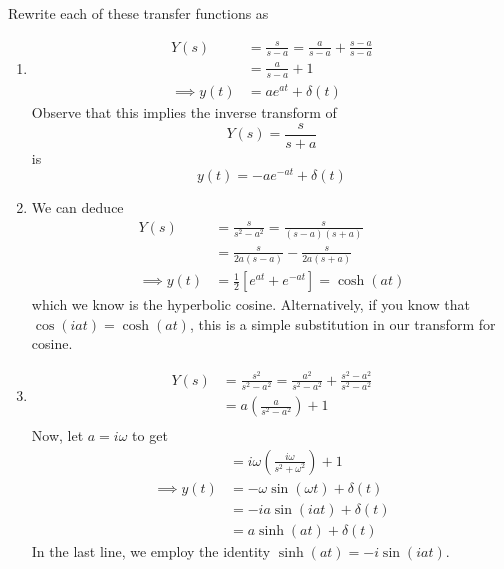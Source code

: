 \documentclass[a4paper]{article}
\begin{document}
Rewrite each of these transfer functions as
\begin{enumerate}[label=(\alph*)]
	\item 
	\begin{align*}
		Y \!\left( s  \right) & = \frac{s }{s - a } = \frac{a }{s - a } + \frac{s - a }{s - a } \\
				      & = \frac{a }{s - a } + 1 \\
				    \implies y \!\left( t \right) & = ae^{at} + \delta \!\left( t \right)
	\end{align*}
	Observe that this implies the inverse transform of 
	\[
		Y \!\left( s  \right) = \frac{s }{s + a } 
	\]
	is 
	\[
		y \!\left( t  \right) = -ae^{-at } + \delta \!\left( t \right) 
	\]
	\item 
	We can deduce
	\begin{align*}
		Y \!\left( s  \right) & = \frac{s }{s^{2} - a^{2}} = \frac{s }{\!\left( s - a  \right)\!\left( s + a \right)} \\
				      & = \frac{s }{2a \!\left( s - a \right)} - \frac{s }{2a \!\left( s + a \right)} \\
				     \implies y \!\left( t \right) & = \frac{1}{2} \!\left[ e^{at } + e^{-at} \right] = \cosh\!\left( at \right)
	\end{align*}
	which we know is the hyperbolic cosine. Alternatively, if you know that \( \cos\!\left( iat \right) = \cosh\!\left( at \right) \), this is a simple substitution in our transform for cosine.
	\item 
	\begin{align*}
		Y \!\left( s  \right) & = \frac{s^{2}}{s^{2} - a^{2}} = \frac{a^{2}}{s^{2} - a^{2}} + \frac{s^{2} - a^{2}}{s^{2} - a^{2}} \\ 
				      & = a \!\left( \frac{a}{s^{2} - a^{2}} \right) + 1 \\
	\end{align*}
	Now, let \( a = i \omega \) to get
	\begin{align*}
				      & = i \omega \!\left( \frac{i \omega}{s^{2} + \omega^{2}} \right) + 1 \\
	\implies y \!\left( t \right) & = - \omega \sin\!\left( \omega t \right) + \delta \!\left( t \right) \\
				      & = -ia \sin\!\left(iat\right) + \delta \!\left( t \right) \\
				      & = a \sinh\!\left( at \right) + \delta \!\left( t \right)
	\end{align*}
	In the last line, we employ the identity \( \sinh\!\left( at \right) = -i \sin\!\left(iat\right)  \).
\end{enumerate}
\end{document}
